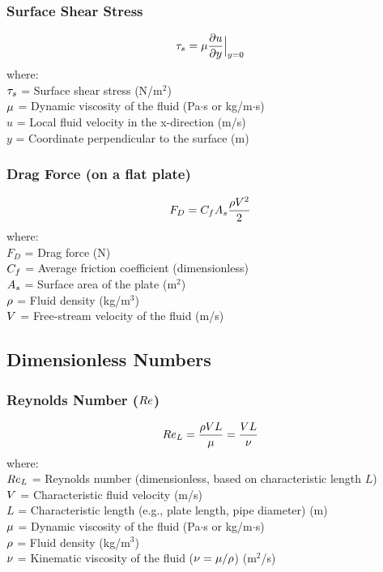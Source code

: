 \subsubsection*{Surface Shear Stress}
\begin{equation}
    \tau_s = \mu \frac{\partial u}{\partial y}\Big|_{y=0}
\end{equation}
where: \\
$\tau_s$ = Surface shear stress (N/m$^2$) \\
$\mu$ = Dynamic viscosity of the fluid (Pa$\cdot$s or kg/m$\cdot$s) \\
$u$ = Local fluid velocity in the x-direction (m/s) \\
$y$ = Coordinate perpendicular to the surface (m)

\subsubsection*{Drag Force (on a flat plate)}
\begin{equation}
    F_D = C_f A_s \frac{\rho V^2}{2}
\end{equation}
where: \\
$F_D$ = Drag force (N) \\
$C_f$ = Average friction coefficient (dimensionless) \\
$A_s$ = Surface area of the plate (m$^2$) \\
$\rho$ = Fluid density (kg/m$^3$) \\
$V$ = Free-stream velocity of the fluid (m/s)

\subsection{Dimensionless Numbers}
\subsubsection*{Reynolds Number ($Re$)}
\begin{equation}
    Re_L = \frac{\rho V L}{\mu} = \frac{V L}{\nu}
\end{equation}
where: \\
$Re_L$ = Reynolds number (dimensionless, based on characteristic length $L$) \\
$V$ = Characteristic fluid velocity (m/s) \\
$L$ = Characteristic length (e.g., plate length, pipe diameter) (m) \\
$\mu$ = Dynamic viscosity of the fluid (Pa$\cdot$s or kg/m$\cdot$s) \\
$\rho$ = Fluid density (kg/m$^3$) \\
$\nu$ = Kinematic viscosity of the fluid ($\nu = \mu/\rho$) (m$^2$/s)

